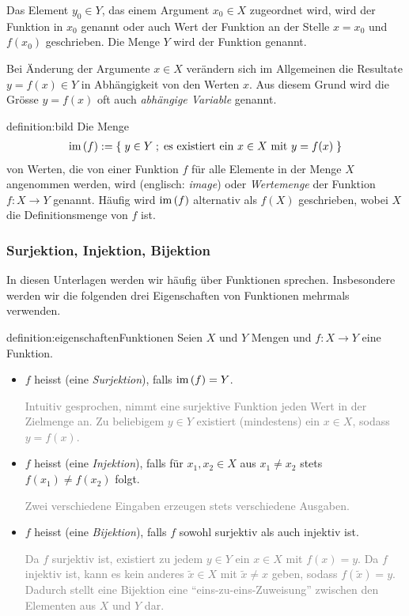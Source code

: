 Das Element $y_0\in Y$, das einem Argument $x_0\in X$ zugeordnet wird, wird  der Funktion in $x_0$ genannt oder auch Wert der Funktion an der Stelle $x = x_0$ und $f(x_0)$ geschrieben. Die Menge $Y$ wird  der Funktion genannt.

Bei Änderung der Argumente $x\in X$ verändern sich im Allgemeinen die Resultate $y = f(x)\in Y$ in Abhängigkeit von den Werten $x$. Aus diesem Grund wird die Grösse $y=f(x)$ oft auch \textit{abhängige Variable} genannt.
\begin{definition}{definition:bild}
Die Menge
\begin{align*}
    \text{im}\left(f\right) := \left\{\;y\in Y \; ; \; \text{es existiert ein $x\in X$ mit $y=f(x)$} \;\right\}
\end{align*}
von Werten, die von einer Funktion $f$ für alle Elemente in der Menge $X$ angenommen werden, wird  (englisch: \textit{image}) oder \textit{Wertemenge} der Funktion $f:X\to Y$ genannt. Häufig wird $\text{im}\left(f\right)$ alternativ als $f(X)$ geschrieben, wobei $X$ die Definitionsmenge von $f$ ist.
\end{definition}

\subsubsection{Surjektion, Injektion, Bijektion}
In diesen Unterlagen werden wir häufig über Funktionen sprechen. Insbesondere werden wir die folgenden drei Eigenschaften von Funktionen mehrmals verwenden.
\begin{definition}{definition:eigenschaftenFunktionen}
Seien $X$ und $Y$ Mengen und $f: X\to Y$ eine Funktion.
\begin{itemize}
    \item $f$ heisst  (eine \textit{Surjektion}), falls $\text{im}\left(f\right) = Y$.
    
    \textcolor{Gray}{Intuitiv gesprochen, nimmt eine surjektive Funktion jeden Wert in der Zielmenge an. Zu beliebigem $y\in Y$ existiert (mindestens) ein $x\in X$, sodass $y=f(x)$.}
    \item $f$ heisst  (eine \textit{Injektion}), falls für $x_1,x_2\in X$ aus $x_1\neq x_2$ stets $f(x_1)\neq f(x_2)$ folgt.
    
    \textcolor{Gray}{Zwei verschiedene Eingaben erzeugen stets verschiedene Ausgaben.}
    \item $f$ heisst  (eine \textit{Bijektion}), falls $f$ sowohl surjektiv als auch injektiv ist.
    
    \textcolor{Gray}{Da $f$ surjektiv ist, existiert zu jedem $y\in Y$ ein $x\in X$ mit $f(x)=y$. Da $f$ injektiv ist, kann es kein anderes $\tilde{x}\in X$ mit $\tilde{x}\neq x$ geben, sodass $f(\tilde{x})=y$. Dadurch stellt eine Bijektion eine \enquote{eins-zu-eins-Zuweisung} zwischen den Elementen aus $X$ und $Y$ dar.}
\end{itemize}
\end{definition}

